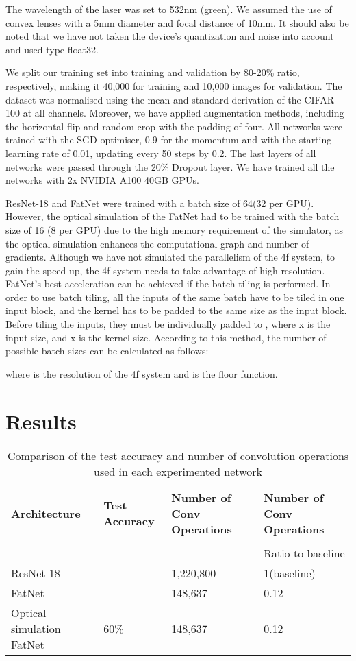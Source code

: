 \documentclass{article}
\begin{document}
The wavelength of the laser was set to 532nm (green). We assumed the use of convex lenses with a 5mm diameter and focal distance of 10mm. It should also be noted that we have not taken the device's quantization and noise into account and used type float32. 

We split our training set into training and validation by 80-20\% ratio, respectively, making it 40,000 for training and 10,000 images for validation.
The dataset was normalised using the mean and standard derivation of the CIFAR-100 at all channels. Moreover, we have applied augmentation methods, including the horizontal flip and random crop with the padding of four. All networks were trained with the SGD optimiser, 0.9 for the momentum and with the starting learning rate of 0.01, updating every 50 steps by 0.2. The last layers of all networks were passed through the 20\% Dropout layer. We have trained all the networks with 2x NVIDIA A100 40GB GPUs.

ResNet-18 and FatNet were trained with a batch size of 64(32 per GPU). However, the optical simulation of the FatNet had to be trained with the batch size of 16 (8 per GPU) due to the high memory requirement of the simulator, as the optical simulation enhances the computational graph and number of gradients. Although we have not simulated the parallelism of the 4f system, to gain the speed-up, the 4f system needs to take advantage of high resolution. FatNet's best acceleration can be achieved if the batch tiling is performed. In order to use batch tiling, all the inputs of the same batch have to be tiled in one input block, and the kernel has to be padded to the same size as the input block. Before tiling the inputs, they must be individually padded to , where x is the input size, and x is the kernel size. According to this method, the number of possible batch sizes can be calculated as follows: 


where  is the resolution of the 4f system and  is the floor function.

\section{Results}

\begin{table}[H]
\caption{ Comparison of the test accuracy and number of convolution operations used in each experimented network}
\begin{tabular}{llll}
\toprule
\textbf{Architecture}	& \textbf{Test Accuracy}	& \textbf{Number of Conv Operations} & \textbf{Number of Conv Operations}\\ \\
&  \small{} & & Ratio to baseline\\
\midrule
ResNet-18	                 	& 		& 1,220,800      &  1(baseline)\\
FatNet	                     	& 		& 148,637        &  0.12\\
Optical simulation FatNet		& 60\%			        & 148,637        &  0.12\\
\bottomrule
\end{tabular}
\label{tab1}
\end{table}
\unskip
\end{document}
